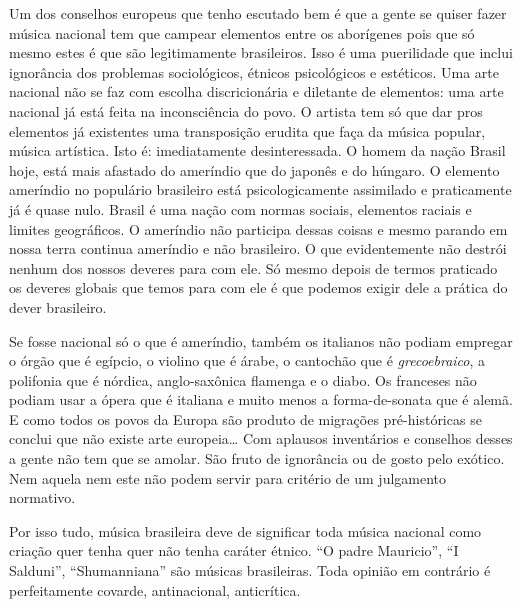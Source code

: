 Um dos conselhos europeus que tenho escutado bem é que a gente se quiser
fazer música nacional tem que campear elementos entre os aborígenes pois
que só mesmo estes é que são legitimamente brasileiros. Isso é uma
puerilidade que inclui ignorância dos problemas sociológicos, étnicos
psicológicos e estéticos. Uma arte nacional não se faz com escolha
discricionária e diletante de elementos: uma arte nacional já está feita
na inconsciência do povo. O artista tem só que dar pros elementos já
existentes uma transposição erudita que faça da música popular, música
artística. Isto é: imediatamente desinteressada. O homem da nação Brasil
hoje, está mais afastado do ameríndio que do japonês e do húngaro. O
elemento ameríndio no populário brasileiro está psicologicamente
assimilado e praticamente já é quase nulo. Brasil é uma nação com normas
sociais, elementos raciais e limites geográficos. O ameríndio não
participa dessas coisas e mesmo parando em nossa terra continua
ameríndio e não brasileiro. O que evidentemente não destrói nenhum dos
nossos deveres para com ele. Só mesmo depois de termos praticado os
deveres globais que temos para com ele é que podemos exigir dele a
prática do dever brasileiro.

Se fosse nacional só o que é ameríndio, também os italianos não podiam
empregar o órgão que é egípcio, o violino que é árabe, o cantochão que é
\textit{grecoebraico}, a polifonia que é nórdica, anglo-saxônica flamenga e o
diabo. Os franceses não podiam usar a ópera que é italiana e muito menos
a forma-de-sonata que é alemã. E como todos os povos da Europa são
produto de migrações pré-históricas se conclui que não existe arte
europeia\ldots{} Com aplausos inventários e conselhos desses a gente não tem
que se amolar. São fruto de ignorância ou de gosto pelo exótico. Nem
aquela nem este não podem servir para critério de um julgamento
normativo.

Por isso tudo, música brasileira deve de significar toda música nacional
como criação quer tenha quer não tenha caráter étnico. ``O padre Mauricio'',
``I Salduni'', ``Shumanniana'' são músicas brasileiras. Toda opinião em
contrário é perfeitamente covarde, antinacional, anticrítica.

